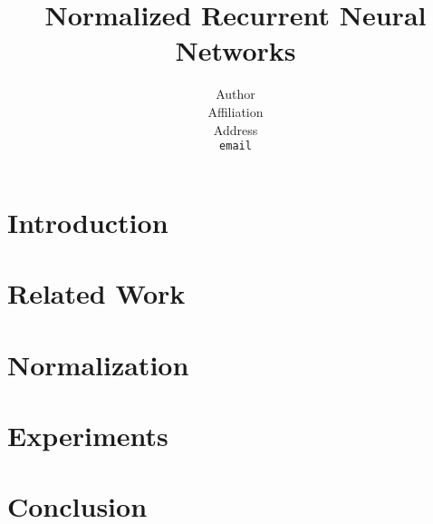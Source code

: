\documentclass{article} %
\title{Normalized Recurrent Neural Networks}
\author{
Author \\
Affiliation \\
Address \\
\texttt{email} \\
}
\begin{document}
\maketitle


\begin{abstract}
\end{abstract}


\section{Introduction}


\section{Related Work}


\section{Normalization}


\section{Experiments}


\section{Conclusion}
\end{document}

